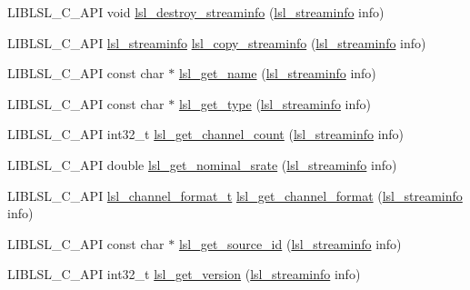 \begin{DoxyCompactItemize}
\item 
L\+I\+B\+L\+S\+L\+\_\+\+C\+\_\+\+A\+PI void \hyperlink{namespacelsl_afc7ae71903a0c20763937739fa62df32}{lsl\+\_\+destroy\+\_\+streaminfo} (\hyperlink{namespacelsl_aa0a9ce9956061679949daa2e35aae2e8}{lsl\+\_\+streaminfo} info)
\item 
L\+I\+B\+L\+S\+L\+\_\+\+C\+\_\+\+A\+PI \hyperlink{namespacelsl_aa0a9ce9956061679949daa2e35aae2e8}{lsl\+\_\+streaminfo} \hyperlink{namespacelsl_a354a91fa3a4c87cdf179443650425390}{lsl\+\_\+copy\+\_\+streaminfo} (\hyperlink{namespacelsl_aa0a9ce9956061679949daa2e35aae2e8}{lsl\+\_\+streaminfo} info)
\item 
L\+I\+B\+L\+S\+L\+\_\+\+C\+\_\+\+A\+PI const char $\ast$ \hyperlink{namespacelsl_ad356f55776a73d03998837c5c32fc95e}{lsl\+\_\+get\+\_\+name} (\hyperlink{namespacelsl_aa0a9ce9956061679949daa2e35aae2e8}{lsl\+\_\+streaminfo} info)
\item 
L\+I\+B\+L\+S\+L\+\_\+\+C\+\_\+\+A\+PI const char $\ast$ \hyperlink{namespacelsl_a417e01d26d64718513bc0ef2c58acf89}{lsl\+\_\+get\+\_\+type} (\hyperlink{namespacelsl_aa0a9ce9956061679949daa2e35aae2e8}{lsl\+\_\+streaminfo} info)
\item 
L\+I\+B\+L\+S\+L\+\_\+\+C\+\_\+\+A\+PI int32\+\_\+t \hyperlink{namespacelsl_a40acd87a21d3c91a524bd72012dc3328}{lsl\+\_\+get\+\_\+channel\+\_\+count} (\hyperlink{namespacelsl_aa0a9ce9956061679949daa2e35aae2e8}{lsl\+\_\+streaminfo} info)
\item 
L\+I\+B\+L\+S\+L\+\_\+\+C\+\_\+\+A\+PI double \hyperlink{namespacelsl_a17e4e6d432dc0b7280df4b5365c7da46}{lsl\+\_\+get\+\_\+nominal\+\_\+srate} (\hyperlink{namespacelsl_aa0a9ce9956061679949daa2e35aae2e8}{lsl\+\_\+streaminfo} info)
\item 
L\+I\+B\+L\+S\+L\+\_\+\+C\+\_\+\+A\+PI \hyperlink{namespacelsl_af188e978739868560b53dbf0ddd58e66}{lsl\+\_\+channel\+\_\+format\+\_\+t} \hyperlink{namespacelsl_a70c26257a8f3042084140a85a867a300}{lsl\+\_\+get\+\_\+channel\+\_\+format} (\hyperlink{namespacelsl_aa0a9ce9956061679949daa2e35aae2e8}{lsl\+\_\+streaminfo} info)
\item 
L\+I\+B\+L\+S\+L\+\_\+\+C\+\_\+\+A\+PI const char $\ast$ \hyperlink{namespacelsl_ad2987f3c32e0edae147498a8870a3215}{lsl\+\_\+get\+\_\+source\+\_\+id} (\hyperlink{namespacelsl_aa0a9ce9956061679949daa2e35aae2e8}{lsl\+\_\+streaminfo} info)
\item 
L\+I\+B\+L\+S\+L\+\_\+\+C\+\_\+\+A\+PI int32\+\_\+t \hyperlink{namespacelsl_ab889dd6f9a5fc6d6cd01a0b3dc153387}{lsl\+\_\+get\+\_\+version} (\hyperlink{namespacelsl_aa0a9ce9956061679949daa2e35aae2e8}{lsl\+\_\+streaminfo} info)

\end{DoxyCompactItemize}
